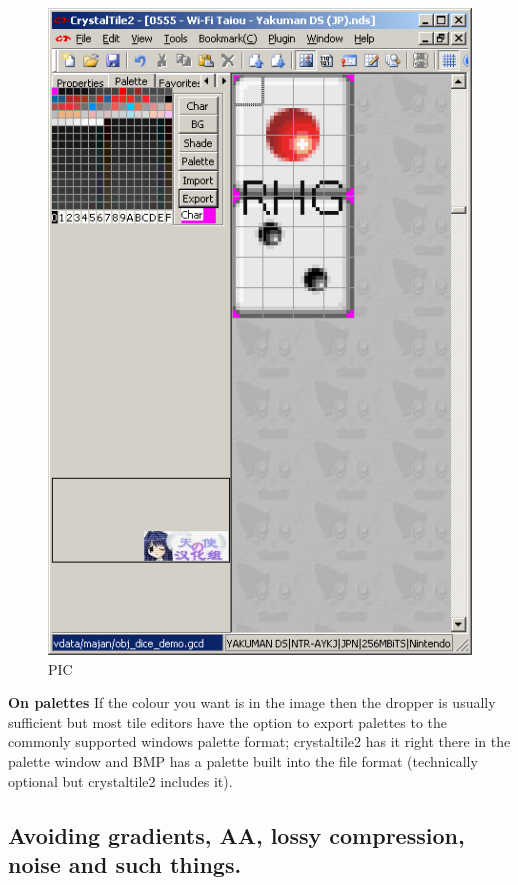 \documentclass[
]{book}
\begin{document}
\begin{figure}
\centering
\includegraphics{images/29_home_fast6191_romhackingguide_unrenamed_file____borders_romhackingguidecrystaltile2export4.png}
\caption{PIC}
\end{figure}

\textbf{On palettes} If the colour you want is in the image then the dropper is usually sufficient but most tile editors have the option to export palettes to the commonly supported windows palette format; crystaltile2 has it right there in the palette window and BMP has a palette built into the file format (technically optional but crystaltile2 includes it).

\hypertarget{avoiding-gradients-aa-lossy-compression-noise-and-such-things.}{%
\subsection{Avoiding gradients, AA, lossy compression, noise and such things.}\label{avoiding-gradients-aa-lossy-compression-noise-and-such-things.}}
\end{document}
